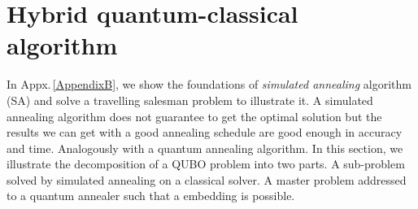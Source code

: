 \section{Hybrid quantum-classical algorithm}
In Appx.\,\ref{AppendixB}, we show the foundations of \textit{simulated annealing} algorithm (SA) and solve a travelling salesman problem to illustrate it. A simulated annealing algorithm does not guarantee to get the optimal solution but the results we can get with a good annealing schedule are good enough in accuracy and time. Analogously with a quantum annealing algorithm. In this section, we illustrate the decomposition of a QUBO problem into two parts. A sub-problem solved by simulated annealing on a classical solver. A master problem addressed to a quantum annealer such that a embedding is possible.
